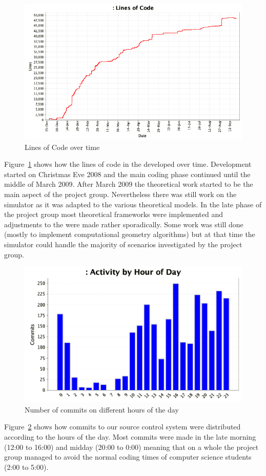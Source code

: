 \begin{figure}[pt]
\centering\includegraphics[width=0.75\linewidth]{chapter_reference_fig/loc}
\caption{Lines of Code over time}\label{IG:fig:loc}
\end{figure}


Figure~\ref{IG:fig:loc} shows how the lines of code in the \RSS developed over time. Development started on Christmas Eve 2008 and the main coding phase continued until the middle of March 2009. After March 2009 the theoretical work started to be the main aspect of the project group. Nevertheless there was still work on the simulator as it was adapted to the various theoretical models. In the late phase of the project group most theoretical frameworks were implemented and adjustments to the \RSS were made rather sporadically. Some work was still done (mostly to implement computational geometry algorithms) but at that time the simulator could handle the majority of scenarios investigated by the project group.

\begin{figure}[phbt]
\centering\includegraphics[width=0.65\linewidth]{chapter_reference_fig/activity_time}
\caption{Number of commits on different hours of the day}\label{IG:fig:time}
\end{figure}

Figure~\ref{IG:fig:time} shows how commits to our source control system were distributed according to the hours of the day. Most commits were made in the late morning (12:00 to 16:00) and midday (20:00 to 0:00) meaning that on a whole the project group managed to avoid the normal coding times of computer science students (2:00 to 5:00).

